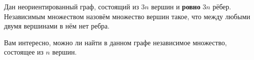 Дан неориентированный граф, состоящий из $3n$ вершин и \textbf{ровно} $3n$ рёбер. Независимым множеством назовём множество вершин такое, что между любыми двумя вершинами в нём нет ребра.

Вам интересно, можно ли найти в данном графе независимое множество, состоящее из $n$ вершин.
